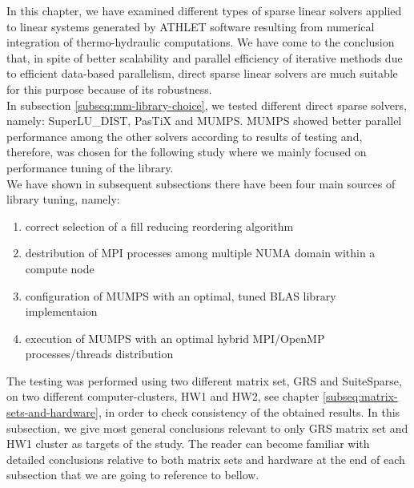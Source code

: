 \label{subseq:mm-conclusion}

In this chapter, we have examined different types of sparse linear solvers applied to linear systems generated by ATHLET software resulting from numerical integration of thermo-hydraulic computations. We have come to the conclusion that, in spite of better scalability and parallel efficiency of iterative methods due to efficient data-based parallelism, direct sparse linear solvers are much suitable for this purpose because of its robustness.\\


In subsection \ref{subseq:mm-library-choice}, we tested different direct sparse solvers, namely: SuperLU\_DIST, PasTiX and MUMPS. MUMPS showed better parallel performance among the other solvers according to results of testing and, therefore, was chosen for the following study where we mainly focused on performance tuning of the library.\\


We have shown in subsequent subsections there have been four main sources of library tuning, namely:

\begin{enumerate}
	\item correct selection of a fill reducing reordering algorithm \label{conclusion:mm-1}
	\item destribution of MPI processes among multiple NUMA domain within a compute node \label{conclusion:mm-2}
	\item configuration of MUMPS with an optimal, tuned BLAS library implementaion \label{conclusion:mm-3}
	\item execution of MUMPS with an optimal hybrid MPI/OpenMP processes/threads distribution \label{conclusion:mm-4}
\end{enumerate}


The testing was performed using two different matrix set, GRS and SuiteSparse, on two different computer-clusters, HW1 and HW2, see chapter \ref{subseq:matrix-sets-and-hardware}, in order to check consistency of the obtained results. In this subsection, we  give most general conclusions relevant to only GRS matrix set and HW1 cluster as targets of the study. The reader can become familiar with detailed conclusions relative to both matrix sets and hardware at the end of each subsection that we are going to reference to bellow.\\



